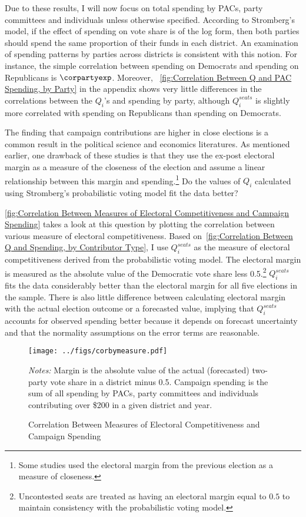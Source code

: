 \documentclass[12pt,final,fleqn]{article}
\theoremstyle{plain}
\begin{document}
Due to these results, I will now focus on total spending by PACs, party committees and individuals unless otherwise specified. According to Stromberg's model, if the effect of spending on vote share is of the log form, then both parties should spend the same proportion of their funds in each district. An examination of spending patterns by parties across districts is consistent with this notion. For instance, the simple correlation between spending on Democrats and spending on Republicans is $\corpartyexp$. Moreover, ~\autoref{fig:Correlation Between Q and PAC Spending, by Party} in the appendix shows very little differences in the correlations between the $Q_i$'s and spending by party, although $Q_i^{seats}$ is slightly more correlated with spending on Republicans than spending on Democrats.

The finding that campaign contributions are higher in close elections is a common result in the political science and economics literatures. As mentioned earlier, one drawback of these studies is that they use the ex-post electoral margin as a measure of the closeness of the election and assume a linear relationship between this margin and spending.\footnote{Some studies used the electoral margin from the previous election as a measure of closeness.} Do the values of $Q_i$ calculated using Stromberg's probabilistic voting model fit the data better?

\autoref{fig:Correlation Between Measures of Electoral Competitiveness and Campaign Spending} takes a look at this question by plotting the correlation between various measure of electoral competitiveness. Based on~\autoref{fig:Correlation Between Q and Spending, by Contributor Type}, I use $Q_i^{seats}$ as the measure of electoral competitiveness derived from the probabilistic voting model. The electoral margin is measured as the absolute value of the Democratic vote share less 0.5.\footnote{Uncontested seats are treated as having an electoral margin equal to $0.5$ to maintain consistency with the probabilistic voting model.} $Q_i^{seats}$ fits the data considerably better than the electoral margin for all five elections in the sample. There is also little difference between calculating electoral margin with the actual election outcome or a forecasted value, implying that $Q_i^{seats}$ accounts for observed spending better because it depends on forecast uncertainty and that the normality assumptions on the error terms are reasonable. 

\begin{figure}[!htb]
\texttt{[image: ../figs/corbymeasure.pdf]}
\vspace{.5cm}
\caption{Correlation Between Measures of Electoral Competitiveness and Campaign Spending}
\label{fig:Correlation Between Measures of Electoral Competitiveness and Campaign Spending}
\begin{minipage}{\linewidth}
\footnotesize
\emph{Notes:} Margin is the absolute value of the actual (forecasted) two-party vote share in a district minus 0.5. Campaign spending is the sum of all spending by PACs, party committees and individuals contributing over \$200 in a given district and year.
\end{minipage}
\end{figure}
\end{document}
